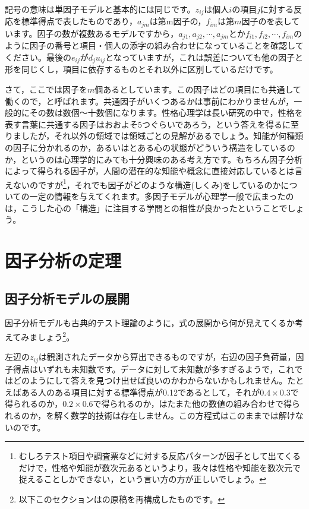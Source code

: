 \documentclass{ltjsbook}
\begin{document}
記号の意味は単因子モデルと基本的には同じです。$z_{ij}$は個人$i$の項目$j$に対する反応を標準得点で表したものであり，$a_{jm}$は第m因子の，$f_{im}$は第$m$因子のを表しています。因子の数が複数あるモデルですから，$a_{j1},a_{j2},\cdots, a_{jm}$とか$f_{i1},f_{i2},\cdots, f_{im}$のように因子の番号と項目・個人の添字の組み合わせになっていることを確認してください。最後の$e_{ij}$が$d_j u_{ij}$となっていますが，これは誤差についても他の因子と形を同じくし，項目に依存するものとそれ以外に区別しているだけです。

さて，ここでは因子を$m$個あるとしています。この因子はどの項目にも共通して働くので，と呼ばれます。共通因子がいくつあるかは事前にわかりませんが，一般的にその数は数個〜十数個になります。性格心理学は長い研究の中で，性格を表す言葉に共通する因子はおおよそ5つぐらいであろう，という答えを得るに至りましたが，それ以外の領域では領域ごとの見解があるでしょう。知能が何種類の因子に分かれるのか，あるいはとある心の状態がどういう構造をしているのか，というのは心理学的にみても十分興味のある考え方です。もちろん因子分析によって得られる因子が，人間の潜在的な知能や概念に直接対応しているとは言えないのですが\footnote{むしろテスト項目や調査票などに対する反応パターンが因子として出てくるだけで，性格や知能が数次元あるというより，我々は性格や知能を数次元で捉えることしかできない，という言い方の方が正しいでしょう。}，それでも因子がどのような構造(しくみ)をしているのかについての一定の情報を与えてくれます。多因子モデルが心理学一般で広まったのは，こうした心の「構造」に注目する学問との相性が良かったということでしょう。

\section{因子分析の定理}
\subsection{因子分析モデルの展開}
因子分析モデルも古典的テスト理論のように，式の展開から何が見えてくるか考えてみましょう\footnote{以下このセクションは\textcite{kosugi2018}の原稿を再構成したものです。}。

左辺の$z_{ij}$は観測されたデータから算出できるものですが，右辺の因子負荷量，因子得点はいずれも未知数です。データに対して未知数が多すぎるようで，これではどのようにして答えを見つけ出せば良いのかわからないかもしれません。たとえばある人のある項目に対する標準得点が0.12であるとして，それが$0.4 \times 0.3$で得られるのか，$0.2 \times 0.6$で得られるのか，はたまた他の数値の組み合わせで得られるのか，を解く数学的技術は存在しません。この方程式はこのままでは解けないのです。
\end{document}
